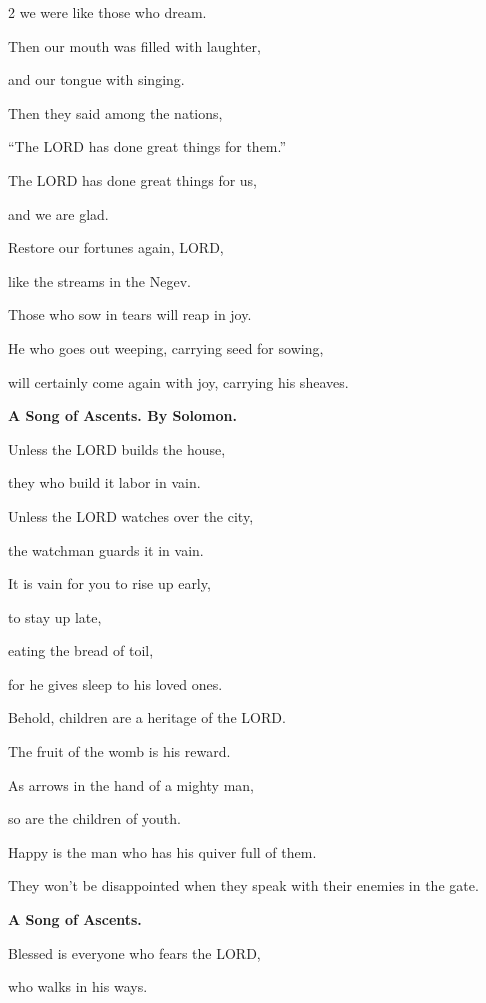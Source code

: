 \begin{multicols}{2}
	we were like those who dream.
	
	
	\myverse{}Then our mouth was filled with laughter,
	
	and our tongue with singing.
	
	Then they said among the nations,
	
	“The LORD has done great things for them.”
	
	
	\myverse{}The LORD has done great things for us,
	
	and we are glad.
	
	
	\myverse{}Restore our fortunes again, LORD,
	
	like the streams in the Negev.
	
	
	\myverse{}Those who sow in tears will reap in joy.
	
	
	\myverse{}He who goes out weeping, carrying seed for sowing,
	
	will certainly come again with joy, carrying his sheaves.
	
	
	\mychapter{}\textbf{A Song of Ascents. By Solomon.}
	
	\quad\quad\quad \myverse*{}Unless the LORD builds the house,
	
	they who build it labor in vain.
	
	Unless the LORD watches over the city,
	
	the watchman guards it in vain.
	
	
	\myverse{}It is vain for you to rise up early,
	
	to stay up late,
	
	eating the bread of toil,
	
	for he gives sleep to his loved ones.
	
	
	\myverse{}Behold, children are a heritage of the LORD.
	
	The fruit of the womb is his reward.
	
	
	\myverse{}As arrows in the hand of a mighty man,
	
	so are the children of youth.
	
	
	\myverse{}Happy is the man who has his quiver full of them.
	
	They won’t be disappointed when they speak with their enemies in the gate.
	
	
	\mychapter{}\textbf{A Song of Ascents.}
	
	\quad\quad\quad \myverse*{}Blessed is everyone who fears the LORD,
	
	who walks in his ways.
	

\end{multicols}
